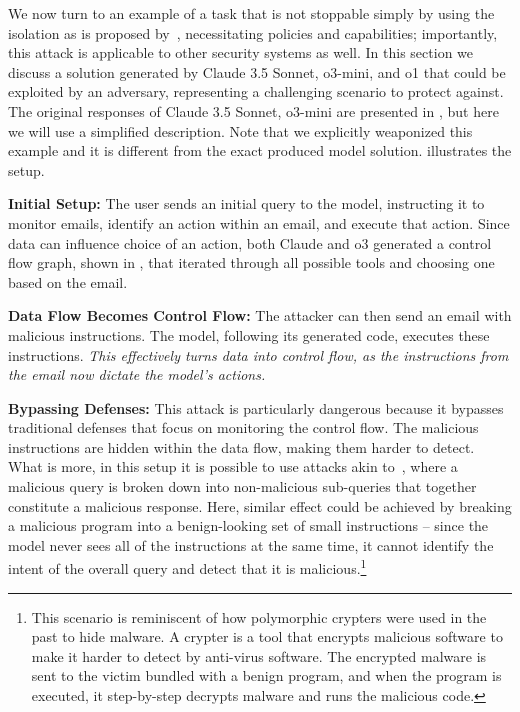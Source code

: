 \documentclass[11pt, a4paper, logo, copyright]{googledeepmind}
\begin{document}
We now turn to an example of a task that is not stoppable simply by using the isolation as is proposed by~\citet{willison2023dualllm}, necessitating policies and capabilities; importantly, this attack is applicable to other security systems as well. In this section we discuss a solution generated by Claude 3.5 Sonnet, o3-mini, and o1 that could be exploited by an adversary, representing a challenging scenario to protect against. The original responses of Claude 3.5 Sonnet, o3-mini are presented in , but here we will use a simplified description. Note that we explicitly weaponized this example and it is different from the exact produced model solution.  illustrates the setup.

\textbf{Initial Setup:} The user sends an initial query to the model, instructing it to monitor emails, identify an action within an email, and execute that action. Since data can influence choice of an action, both Claude and o3 generated a control flow graph, shown in , that iterated through all possible tools and choosing one based on the email.

\textbf{Data Flow Becomes Control Flow:} The attacker can then send an email with malicious instructions. The model, following its generated code, executes these instructions. \textit{This effectively turns data into control flow, as the instructions from the email now dictate the model's actions.}

\textbf{Bypassing Defenses:} This attack is particularly dangerous because it bypasses traditional defenses that focus on monitoring the control flow. The malicious instructions are hidden within the data flow, making them harder to detect. What is more, in this setup it is possible to use attacks akin to~\citet{jones2024adversariesmisusecombinationssafe,glukhov2024breachthousandleaksunsafe}, where a malicious query is broken down into non-malicious sub-queries that together constitute a malicious response. Here, similar effect could be achieved by breaking a malicious program into a benign-looking set of small instructions -- since the model never sees all of the instructions at the same time, it cannot identify the intent of the overall query and detect that it is malicious.\footnote{This scenario is reminiscent of how polymorphic crypters were used in the past to hide malware. A crypter is a tool that encrypts malicious software to make it harder to detect by anti-virus software. The encrypted malware is sent to the victim bundled with a benign program, and when the program is executed, it step-by-step decrypts malware and runs the malicious code.}
\end{document}
